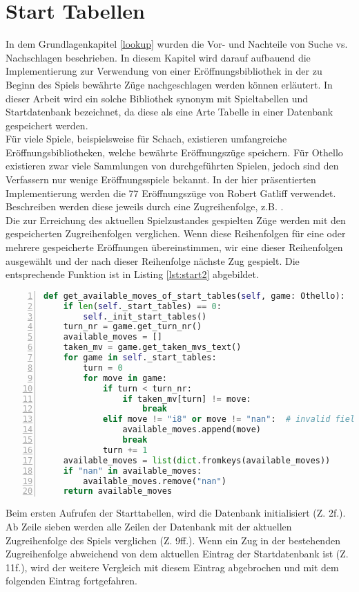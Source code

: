 \section{Start Tabellen}
In dem Grundlagenkapitel \ref{lookup} wurden die Vor- und Nachteile von Suche vs. Nachschlagen beschrieben. In diesem Kapitel wird darauf aufbauend die Implementierung zur Verwendung von einer Eröffnungsbibliothek in der zu Beginn des Spiels bewährte Züge nachgeschlagen werden können erläutert. In dieser Arbeit wird ein solche Bibliothek synonym mit Spieltabellen und Startdatenbank bezeichnet, da diese als eine Arte Tabelle in einer Datenbank gespeichert werden.
\\Für viele Spiele, beispielsweise für Schach, existieren umfangreiche Eröffnungsbibliotheken, welche bewährte Eröffnungszüge speichern. Für Othello existieren zwar viele Sammlungen von durchgeführten Spielen, jedoch sind den Verfassern nur wenige Eröffnungsspiele bekannt. In der hier präsentierten Implementierung werden die 77 Eröffnungszüge von Robert Gatliff \cite{open1} verwendet. Beschreiben werden diese jeweils durch eine Zugreihenfolge, z.B. . 
\\Die zur Erreichung des aktuellen Spielzustandes gespielten Züge werden mit den gespeicherten Zugreihenfolgen verglichen. Wenn diese Reihenfolgen für eine oder mehrere gespeicherte Eröffnungen übereinstimmen, wir eine dieser Reihenfolgen ausgewählt und der nach dieser Reihenfolge nächste Zug gespielt. Die entsprechende Funktion  ist in Listing \ref{lst:start2} abgebildet.
\begin{lstlisting}[basicstyle=\footnotesize, caption = {Befüllen der Datenbank 2}, language = python, captionpos = t , numbers=left, label={lst:start2}]
def get_available_moves_of_start_tables(self, game: Othello):
	if len(self._start_tables) == 0:
		self._init_start_tables()
	turn_nr = game.get_turn_nr()
	available_moves = []
	taken_mv = game.get_taken_mvs_text()
	for game in self._start_tables:
		turn = 0
		for move in game:
			if turn < turn_nr:
				if taken_mv[turn] != move:
					break
			elif move != "i8" or move != "nan":  # invalid field
				available_moves.append(move)
				break
			turn += 1
	available_moves = list(dict.fromkeys(available_moves))
	if "nan" in available_moves:
		available_moves.remove("nan")
	return available_moves
\end{lstlisting}
Beim ersten Aufrufen der Starttabellen, wird die Datenbank initialisiert (Z. 2f.). Ab Zeile sieben werden alle Zeilen der Datenbank mit der aktuellen Zugreihenfolge des Spiels verglichen (Z. 9ff.). Wenn ein Zug in der bestehenden Zugreihenfolge abweichend von dem aktuellen Eintrag der Startdatenbank ist (Z. 11f.), wird der weitere Vergleich mit diesem Eintrag abgebrochen und mit dem folgenden Eintrag fortgefahren.
